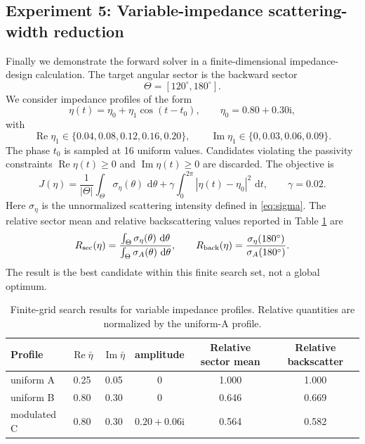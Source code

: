 \documentclass[11pt]{article}
\numberwithin{equation}{section}
\newcommand{\ii}{\mathrm{i}}
\newcommand{\dd}{\,\mathrm{d}}
\begin{document}
\subsection{Experiment 5: Variable-impedance scattering-width reduction}

Finally we demonstrate the forward solver in a finite-dimensional impedance-design calculation. The target angular sector is the backward sector
\[
\Theta=[120^\circ,180^\circ].
\]
We consider impedance profiles of the form
\begin{equation}
\eta(t)=\eta_0+\eta_1\cos(t-t_0),
\qquad \eta_0=0.80+0.30\ii,
\end{equation}
with
\[
\operatorname{Re}\eta_1\in\{0.04,0.08,0.12,0.16,0.20\},\qquad
\operatorname{Im}\eta_1\in\{0,0.03,0.06,0.09\}.
\]
The phase $t_0$ is sampled at 16 uniform values. Candidates violating the passivity constraints $\operatorname{Re}\eta(t)\ge0$ and $\operatorname{Im}\eta(t)\ge0$ are discarded. The objective is
\begin{equation}
J(\eta)=\frac1{|\Theta|}\int_\Theta \sigma_\eta(\theta)\,\dd\theta
+\gamma\int_0^{2\pi}|\eta(t)-\eta_0|^2\,\dd t,\qquad \gamma=0.02.
\end{equation}
Here $\sigma_\eta$ is the unnormalized scattering intensity defined in \eqref{eq:sigma}. The relative sector mean and relative backscattering values reported in Table \ref{tab:impedance_search} are
\begin{equation}
R_{\rm sec}(\eta)=
\frac{\int_\Theta \sigma_\eta(\theta)\,\dd\theta}
{\int_\Theta \sigma_A(\theta)\,\dd\theta},
\qquad
R_{\rm back}(\eta)=
\frac{\sigma_\eta(180^\circ)}{\sigma_A(180^\circ)}.
\end{equation}
The result is the best candidate within this finite search set, not a global optimum.

\begin{table}[htbp]
\centering
\caption{Finite-grid search results for variable impedance profiles. Relative quantities are normalized by the uniform-A profile.}
\label{tab:impedance_search}
\begin{tabular}{lccccc}
\toprule
Profile & $\operatorname{Re}\bar\eta$ & $\operatorname{Im}\bar\eta$ & amplitude & Relative sector mean & Relative backscatter\\
\midrule
uniform A&0.25&0.05&0&1.000&1.000\\
uniform B&0.80&0.30&0&0.646&0.669\\
modulated C&0.80&0.30&$0.20+0.06\ii$&0.564&0.582\\
\bottomrule
\end{tabular}
\end{table}
\end{document}
